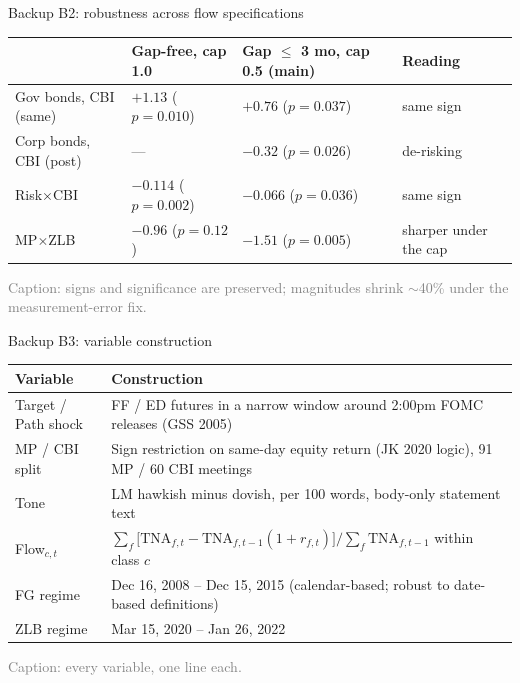 \documentclass[aspectratio=169, 11pt]{beamer}
\begin{document}
\begin{frame}{Backup B2: robustness across flow specifications}
  \footnotesize
  \begin{tabularx}{\textwidth}{l l l l}
    \toprule
    & \textbf{Gap-free, cap 1.0} & \textbf{Gap $\leq$ 3 mo, cap 0.5 (main)} & \textbf{Reading} \\
    \midrule
    Gov bonds, CBI (same) & $+1.13$ ($p=0.010$) & $+0.76$ ($p=0.037$) & same sign \\
    Corp bonds, CBI (post) & --- & $-0.32$ ($p=0.026$) & de-risking \\
    Risk$\times$CBI & $-0.114$ ($p=0.002$) & $-0.066$ ($p=0.036$) & same sign \\
    MP$\times$ZLB & $-0.96$ ($p=0.12$) & $-1.51$ ($p=0.005$) & sharper under the cap \\
    \bottomrule
  \end{tabularx}
  {\scriptsize\textcolor{gray}{Caption: signs and significance are preserved; magnitudes shrink $\sim$40\% under the measurement-error fix.}}
\end{frame}

\begin{frame}{Backup B3: variable construction}
  \footnotesize
  \begin{tabularx}{\textwidth}{l X}
    \toprule
    \textbf{Variable} & \textbf{Construction} \\
    \midrule
    Target / Path shock & FF / ED futures in a narrow window around 2:00pm FOMC releases (GSS 2005) \\
    MP / CBI split & Sign restriction on same-day equity return (JK 2020 logic), 91 MP / 60 CBI meetings \\
    Tone & LM hawkish minus dovish, per 100 words, body-only statement text \\
    Flow$_{c,t}$ & $\sum_f \big[\mathrm{TNA}_{f,t} - \mathrm{TNA}_{f,t-1}(1+r_{f,t})\big] \big/ \sum_f \mathrm{TNA}_{f,t-1}$ within class $c$ \\
    FG regime & Dec 16, 2008 -- Dec 15, 2015 (calendar-based; robust to date-based definitions) \\
    ZLB regime & Mar 15, 2020 -- Jan 26, 2022 \\
    \bottomrule
  \end{tabularx}
  {\scriptsize\textcolor{gray}{Caption: every variable, one line each.}}
\end{frame}
\end{document}
